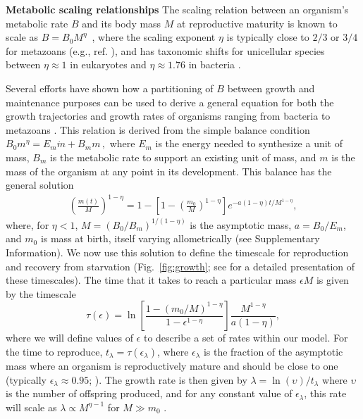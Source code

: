 \documentclass[twocolumn,preprintnumbers,amsmath,amssymb,superscriptaddress]{revtex4}
\begin{document}
\begin{bibunit}[unsrt]
{{\bf Metabolic scaling relationships}
The scaling relation between an organism's metabolic
rate $B$ and its body mass $M$ at reproductive maturity is known to scale as
$B = B_0 M^\eta$~\citep{West:2002it}, where the scaling exponent $\eta$ is
typically close to $2/3$ or $3/4$ for metazoans (e.g., ref. \citep{Brown:2004wq}),
and has taxonomic shifts for unicellular species between $\eta\approx 1$ in
eukaryotes and $\eta\approx 1.76$ in bacteria
\citep{DeLong:2010dy,Kempes:2012hy}.

Several efforts have shown how a partitioning of $B$ between growth and
maintenance purposes can be used to derive a general equation for both the
growth trajectories and growth rates of organisms ranging from bacteria to
metazoans
\citep{West:2001bv,moses2008rmo,gillooly2002esa,hou,Kempes:2012hy}. This relation is derived from the simple balance condition 
$B_{0}m^{\eta}=E_{m}\dot{m}+B_{m}m\,,$
\citep{West:2001bv,moses2008rmo,gillooly2002esa,hou,Kempes:2012hy} where $E_{m}$ is the energy needed to synthesize a unit of mass, $B_{m}$ is
the metabolic rate to support an existing unit of mass, and $m$ is the mass
of the organism at any point in its development.  This balance has the
general solution \citep{bettencourt,Kempes:2012hy}
\begin{eqnarray}
\label{m1}
\left(\frac{m\left(t\right)}{M}\right)^{1-\eta}\!=1\!-\!\left[1\!-\!\left(\frac{m_{0}}{M}\right)^{1\!-\!\eta}\right]e^{-a\left(1\!-\!\eta\right)t/M^{1-\eta}},
\end{eqnarray}
where, for $\eta<1$, $M=(B_{0}/B_{m})^{1/(1-\eta)}$ is the asymptotic mass, $a=B_{0}/E_{m}$, and $m_0$ is mass at birth, itself varying allometrically (see Supplementary Information).  We now use this solution to define the timescale for reproduction and recovery from starvation (Fig.~\ref{fig:growth}; see \citep{moses2008rmo} for a detailed presentation of these timescales). The time that it takes to reach a particular mass $\epsilon M$ is given by the timescale
\begin{equation}
\label{t1}
\tau\left(\epsilon\right) = \ln\left[\frac{1-\left(m_{0}/M\right)^{1-\eta}}{1-\epsilon^{1-\eta}}\right]\frac{M^{1-\eta}}{a\left(1-\eta\right)},
\end{equation}
where we will define values of $\epsilon$ to describe a set of rates within our model. For the time to reproduce, $t_{\lambda}=\tau\left(\epsilon_{\lambda}\right)$, where $\epsilon_{\lambda}$ is the fraction of the asymptotic mass where an organism is reproductively mature and should be close to one (typically $\epsilon_{\lambda}\approx0.95$; \citep{West:2001bv}). The growth rate is then given by $\lambda=\ln\left(\upsilon\right)/t_{\lambda}$ where $\upsilon$ is the number of offspring produced, and for any constant value of $\epsilon_{\lambda}$, this rate will scale as $\lambda\propto M^{\eta-1}$ for $M\gg m_{0}$ \citep{West:2001bv,moses2008rmo,gillooly2002esa,hou,Kempes:2012hy}.


}
\end{bibunit}
\end{document}
